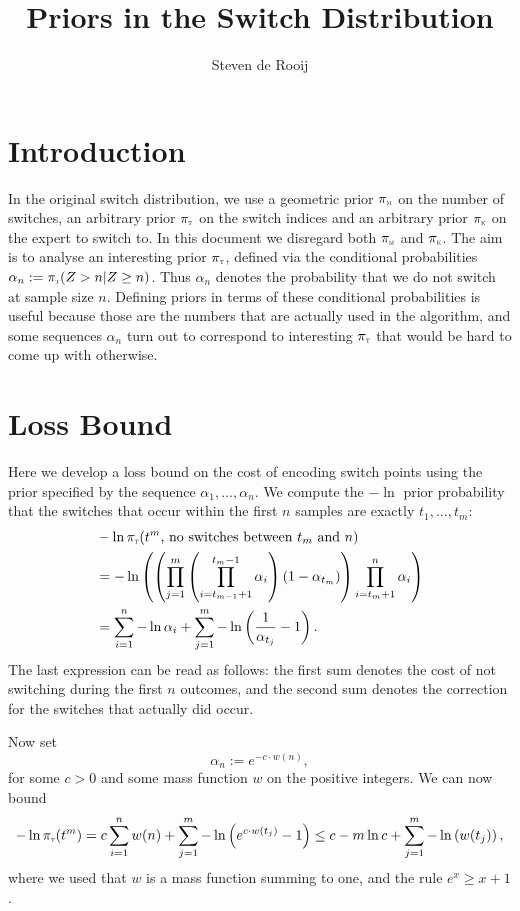 \documentclass[a4paper]{article}
\title{Priors in the Switch Distribution}
\author{Steven de Rooij}
\theoremstyle{example}
\theoremstyle{remark}
\newcommand{\del}[1]{\left(#1\right)}
\newcommand{\pim}{\ensuremath{\pi_\textsc{\tiny{m}}}}
\newcommand{\pit}{\ensuremath{\pi_\textsc{\tiny{t}}}}
\newcommand{\pik}{\ensuremath{\pi_\textsc{\tiny{k}}}}
\begin{document}
\maketitle

\section{Introduction}
In the original switch distribution, we use a geometric prior $\pim$
on the number of switches, an arbitrary prior $\pit$ on the switch
indices and an arbitrary prior $\pik$ on the expert to switch to. In
this document we disregard both $\pim$ and $\pik$. The aim is to
analyse an interesting prior $\pit$, defined via the conditional
probabilities $\alpha_n:=\pit(Z>n|Z\ge n)$. Thus $\alpha_n$ denotes the
probability that we do not switch at sample size $n$. Defining priors
in terms of these conditional probabilities is useful because those
are the numbers that are actually used in the algorithm, and some
sequences $\alpha_n$ turn out to correspond to interesting $\pit$ that
would be hard to come up with otherwise.

\section{Loss Bound}
Here we develop a loss bound on the cost of encoding switch points
using the prior specified by the sequence $\alpha_1,\ldots,\alpha_n$.
We compute the $-\ln$ prior probability that the switches that occur
within the first $n$ samples are exactly $t_1,\ldots,t_m$:
\begin{equation}\label{eq:bnd}
\begin{split}
  &-\ln\pit(t^m\text{, no switches between $t_m$ and $n$})\\
&=-\ln\del{\del{\prod_{j=1}^m\del{\prod_{i=t_{m-1}+1}^{t_m-1}\alpha_i}(1-\alpha_{t_m})}\prod_{i=t_m+1}^n\alpha_i}\\
  &= \sum_{i=1}^n-\ln\alpha_i+\sum_{j=1}^m-\ln\del{\frac{1}{\alpha_{t_j}}-1}.
\end{split}
\end{equation}
The last expression can be read as follows: the first sum denotes the
cost of not switching during the first $n$ outcomes, and the second
sum denotes the correction for the switches that actually did occur.

Now set
\begin{equation}
  \alpha_n:=e^{-c\cdot w(n)},
\end{equation}
for some $c>0$ and some mass function $w$ on the positive integers. We
can now bound
\begin{equation}\label{eq:bnd2}
-\ln\pit(t^m)=c\sum_{i=1}^n w(n)+\sum_{j=1}^m -\ln\del{e^{c\cdot w(t_j)}-1}\le
c-m\ln c+\sum_{j=1}^m -\ln\del{w(t_j)},
\end{equation}
where we used that $w$ is a mass function summing to one, and the rule
$e^x\ge x+1$.
\end{document}
